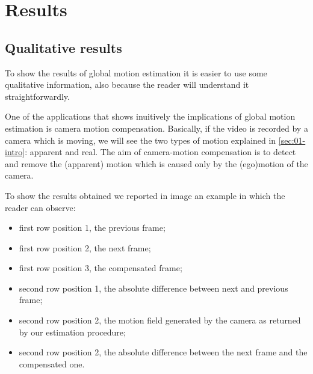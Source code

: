 \section{Results}
\label{sec:04-results}

\subsection{Qualitative results}

To show the results of global motion estimation it is easier to use some qualitative information, also because the reader will understand it straightforwardly.

One of the applications that shows inuitively the implications of global motion estimation is camera motion compensation. 
Basically, if the video is recorded by a camera which is moving, we will see the two types of motion explained in \cref{sec:01-intro}: apparent and real. The aim of camera-motion compensation is to detect and remove the (apparent) motion which is caused only by the (ego)motion of the camera.

To show the results obtained we reported in image  an example in which the reader can observe:
\begin{itemize}
    \item first row position 1, the previous frame;
    \item first row position 2, the next frame;
    \item first row position 3, the compensated frame;
    \item second row position 1, the absolute difference between next and previous frame;
    \item second row position 2, the motion field generated by the camera as returned by our estimation procedure;
    \item second row position 2, the absolute difference between the next frame and the compensated one.
\end{itemize}



